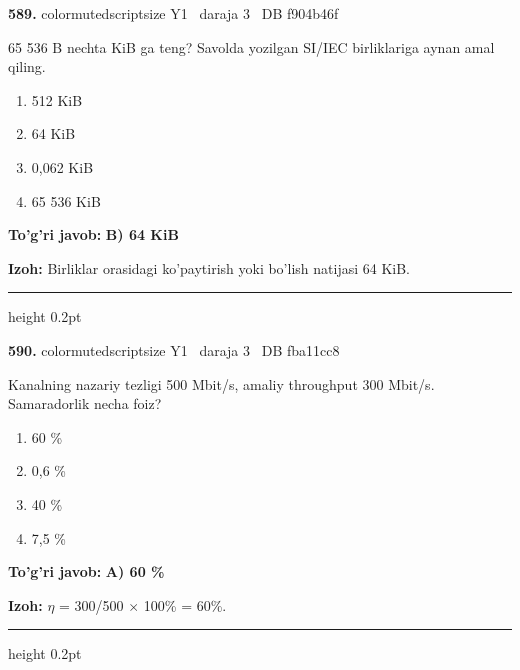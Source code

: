 \documentclass[10pt,a4paper,oneside]{article}
\begin{document}
\noindent\textbf{\color{ink}589.}  {color{muted}scriptsize Y1 \textbullet\ daraja 3 \textbullet\ DB f904b46f}
\par
65 536 B nechta KiB ga teng? Savolda yozilgan SI/IEC birliklariga aynan amal qiling.
\begin{enumerate}[label=\Alph*),leftmargin=9mm]
\item 512 KiB
\item 64 KiB
\item 0,062 KiB
\item 65 536 KiB
\end{enumerate}
\begin{tcolorbox}[enhanced,breakable,colback=teal!4,colframe=teal!50!black,boxrule=0.5pt,arc=1.1mm,left=3mm,right=3mm,top=1.7mm,bottom=1.7mm,before skip=2mm,after skip=2mm]
\textbf{\color{teal}To'g'ri javob:} \textbf{B) 64 KiB}
\par\smallskip
\textbf{Izoh:} Birliklar orasidagi ko'paytirish yoki bo'lish natijasi 64 KiB.
\end{tcolorbox}
\vspace{2mm}\hrule height 0.2pt \vspace{3mm}

\noindent\textbf{\color{ink}590.}  {color{muted}scriptsize Y1 \textbullet\ daraja 3 \textbullet\ DB fba11cc8}
\par
Kanalning nazariy tezligi 500 Mbit/s, amaliy throughput 300 Mbit/s. Samaradorlik necha foiz?
\begin{enumerate}[label=\Alph*),leftmargin=9mm]
\item 60 \%
\item 0,6 \%
\item 40 \%
\item 7,5 \%
\end{enumerate}
\begin{tcolorbox}[enhanced,breakable,colback=teal!4,colframe=teal!50!black,boxrule=0.5pt,arc=1.1mm,left=3mm,right=3mm,top=1.7mm,bottom=1.7mm,before skip=2mm,after skip=2mm]
\textbf{\color{teal}To'g'ri javob:} \textbf{A) 60 \%}
\par\smallskip
\textbf{Izoh:} \ensuremath{\eta} = 300/500 \ensuremath{\times} 100\% = 60\%.
\end{tcolorbox}
\vspace{2mm}\hrule height 0.2pt \vspace{3mm}
\end{document}

